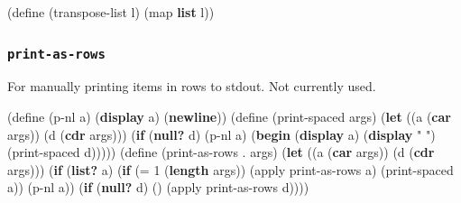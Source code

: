 \documentclass[
]{article}
\newenvironment{Shaded}{}{}
\newcommand{\DecValTok}[1]{\textcolor[rgb]{0.25,0.63,0.44}{#1}}
\newcommand{\ExtensionTok}[1]{#1}
\newcommand{\FunctionTok}[1]{\textcolor[rgb]{0.02,0.16,0.49}{#1}}
\newcommand{\KeywordTok}[1]{\textcolor[rgb]{0.00,0.44,0.13}{\textbf{#1}}}
\newcommand{\NormalTok}[1]{#1}
\newcommand{\OperatorTok}[1]{\textcolor[rgb]{0.40,0.40,0.40}{#1}}
\newcommand{\StringTok}[1]{\textcolor[rgb]{0.25,0.44,0.63}{#1}}
\begin{document}
\hypertarget{transpose-list}{%
\label{transpose-list}}%
\begin{Shaded}
\begin{Highlighting}[numbers=left,,]
\NormalTok{(}\ExtensionTok{define}\FunctionTok{ }\NormalTok{(transpose{-}list l)}
\NormalTok{  (map }\KeywordTok{list}\NormalTok{ l))}
\end{Highlighting}
\end{Shaded}

\hypertarget{print-as-rows}{%
\subsubsection{\texorpdfstring{\texttt{print-as-rows}}{print-as-rows}}\label{print-as-rows}}

For manually printing items in rows to stdout. Not currently used.

\hypertarget{print-as-rows}{%
\label{print-as-rows}}%
\begin{Shaded}
\begin{Highlighting}[numbers=left,,]
\NormalTok{(}\ExtensionTok{define}\FunctionTok{ }\NormalTok{(p{-}nl a)}
\NormalTok{  (}\KeywordTok{display}\NormalTok{ a)}
\NormalTok{  (}\KeywordTok{newline}\NormalTok{))}
\NormalTok{(}\ExtensionTok{define}\FunctionTok{ }\NormalTok{(print{-}spaced args)}
\NormalTok{  (}\KeywordTok{let}\NormalTok{ ((a (}\KeywordTok{car}\NormalTok{ args))}
\NormalTok{        (d (}\KeywordTok{cdr}\NormalTok{ args)))}
\NormalTok{    (}\KeywordTok{if}\NormalTok{ (}\KeywordTok{null?}\NormalTok{ d)}
\NormalTok{        (p{-}nl a)}
\NormalTok{        (}\KeywordTok{begin}\NormalTok{ (}\KeywordTok{display}\NormalTok{ a)}
\NormalTok{               (}\KeywordTok{display} \StringTok{" "}\NormalTok{)}
\NormalTok{               (print{-}spaced d)))))}
\NormalTok{(}\ExtensionTok{define}\FunctionTok{ }\NormalTok{(print{-}as{-}rows }\OperatorTok{.}\NormalTok{ args)}
\NormalTok{  (}\KeywordTok{let}\NormalTok{ ((a (}\KeywordTok{car}\NormalTok{ args))}
\NormalTok{        (d (}\KeywordTok{cdr}\NormalTok{ args)))}
\NormalTok{    (}\KeywordTok{if}\NormalTok{ (}\KeywordTok{list?}\NormalTok{ a)}
\NormalTok{        (}\KeywordTok{if}\NormalTok{ (}\OperatorTok{=} \DecValTok{1}\NormalTok{ (}\KeywordTok{length}\NormalTok{ args))}
\NormalTok{            (apply print{-}as{-}rows a)}
\NormalTok{            (print{-}spaced a))}
\NormalTok{        (p{-}nl a))}
\NormalTok{    (}\KeywordTok{if}\NormalTok{ (}\KeywordTok{null?}\NormalTok{ d)}
\NormalTok{        \textquotesingle{}()}
\NormalTok{        (apply print{-}as{-}rows d))))}
\end{Highlighting}
\end{Shaded}
\end{document}
